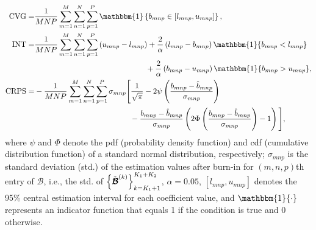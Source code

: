 \documentclass[12pt]{article}
\begin{document}
\begin{equation} \notag
\begin{aligned}
\text{CVG}=&\frac{1}{MNP}\sum_{m=1}^{M}\sum_{n=1}^{N}\sum_{p=1}^{P}\mathbbm{1}\left\{{b}_{mnp}\in\left[l_{mnp},u_{mnp}\right]\right\}, \\
\text{INT}=&\frac{1}{MNP}\sum_{m=1}^{M}\sum_{n=1}^{N}\sum_{p=1}^{P}\left(u_{mnp}-l_{mnp}\right)+\frac{2}{\alpha}\left(l_{mnp}-b_{mnp}\right)\mathbbm{1}\{b_{mnp}<l_{mnp}\} \\
&~~~~~~~~~~~~~~~~~~~~~~~~~~~~~~~~~~~~~~~~~~~+\frac{2}{\alpha}\left(b_{mnp}-u_{mnp}\right)\mathbbm{1}\{b_{mnp}>u_{mnp}\}, \\
\text{CRPS}=&-\frac{1}{MNP}\sum_{m=1}^{M}\sum_{n=1}^{N}\sum_{p=1}^{P}\sigma_{mnp}\Bigg[\frac{1}{\sqrt{\pi}}-2\psi\left(\frac{b_{mnp}-\hat{b}_{mnp}}{\sigma_{mnp}}\right) \\
&~~~~~~~~~~~~~~~~~~~~~~~~~~~~~~~~~~~~~-\frac{b_{mnp}-\hat{b}_{mnp}}{\sigma_{mnp}}\left(2\Phi\left(\frac{b_{mnp}-\hat{b}_{mnp}}{\sigma_{mnp}}\right)-1\right)\Bigg], \\
\end{aligned}
\end{equation}
where $\psi$ and $\Phi$ denote the pdf (probability density function) and cdf (cumulative distribution function) of a standard normal distribution, respectively; $\sigma_{mnp}$ is the standard deviation (std.) of the estimation values after burn-in for $(m,n,p)$th entry of $\boldsymbol{\mathcal{B}}$, i.e., the std. of $\left\{\Tilde{\boldsymbol{\mathcal{B}}}^{(k)}\right\}_{k=K_1+1}^{K_1+K_2}$, $\alpha=0.05$, $[l_{mnp},u_{mnp}]$ denotes the 95\% central estimation interval for each coefficient value, and $\mathbbm{1}\{\cdot\}$ represents an indicator function that equals 1 if the condition is true and 0 otherwise.
\end{document}
